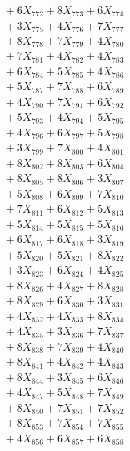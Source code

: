 \documentclass[a4paper,10pt]{article}
\begin{document}
{\begin{align}
&\;  + 6 X_{772} + 8 X_{773} + 6 X_{774} \\[0.3ex]
&\;  + 3 X_{775} + 4 X_{776} + 7 X_{777} \\[0.3ex]
&\;  + 8 X_{778} + 7 X_{779} + 4 X_{780} \\[0.3ex]
&\;  + 7 X_{781} + 4 X_{782} + 4 X_{783} \\[0.3ex]
&\;  + 6 X_{784} + 5 X_{785} + 4 X_{786} \\[0.3ex]
&\;  + 5 X_{787} + 7 X_{788} + 6 X_{789} \\[0.5ex]\allowbreak
&\;  + 4 X_{790} + 7 X_{791} + 6 X_{792} \\[0.3ex]
&\;  + 5 X_{793} + 4 X_{794} + 5 X_{795} \\[0.3ex]
&\;  + 4 X_{796} + 6 X_{797} + 5 X_{798} \\[0.3ex]
&\;  + 3 X_{799} + 7 X_{800} + 4 X_{801} \\[0.3ex]
&\;  + 8 X_{802} + 8 X_{803} + 6 X_{804} \\[0.3ex]
&\;  + 8 X_{805} + 8 X_{806} + 3 X_{807} \\[0.3ex]
&\;  + 5 X_{808} + 6 X_{809} + 7 X_{810} \\[0.3ex]
&\;  + 7 X_{811} + 6 X_{812} + 5 X_{813} \\[0.3ex]
&\;  + 5 X_{814} + 5 X_{815} + 5 X_{816} \\[0.3ex]
&\;  + 6 X_{817} + 6 X_{818} + 3 X_{819} \\[0.5ex]\allowbreak
&\;  + 5 X_{820} + 5 X_{821} + 8 X_{822} \\[0.3ex]
&\;  + 3 X_{823} + 6 X_{824} + 4 X_{825} \\[0.3ex]
&\;  + 8 X_{826} + 4 X_{827} + 8 X_{828} \\[0.3ex]
&\;  + 8 X_{829} + 6 X_{830} + 3 X_{831} \\[0.3ex]
&\;  + 4 X_{832} + 4 X_{833} + 8 X_{834} \\[0.3ex]
&\;  + 4 X_{835} + 3 X_{836} + 7 X_{837} \\[0.3ex]
&\;  + 8 X_{838} + 7 X_{839} + 4 X_{840} \\[0.3ex]
&\;  + 8 X_{841} + 4 X_{842} + 4 X_{843} \\[0.3ex]
&\;  + 8 X_{844} + 3 X_{845} + 6 X_{846} \\[0.3ex]
&\;  + 4 X_{847} + 5 X_{848} + 7 X_{849} \\[0.5ex]\allowbreak
&\;  + 8 X_{850} + 7 X_{851} + 7 X_{852} \\[0.3ex]
&\;  + 8 X_{853} + 7 X_{854} + 7 X_{855} \\[0.3ex]
&\;  + 4 X_{856} + 6 X_{857} + 6 X_{858} \\[0.3ex]

\end{align}}
\end{document}

